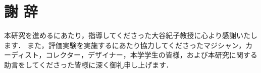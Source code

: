 \chapter*{謝 辞}
本研究を進めるにあたり，指導してくださった大谷紀子教授に心より感謝いたします．
また，評価実験を実施するにあたり協力してくださったマジシャン，カーディスト，コレクター，デザイナー，本学学生の皆様，および本研究に関する助言をしてくださった皆様に深く御礼申し上げます．
